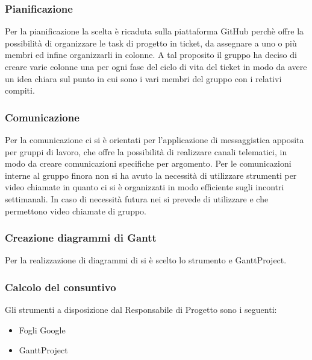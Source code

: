 \subsubsection{Pianificazione}
Per la pianificazione la scelta è ricaduta sulla piattaforma GitHub perchè offre la possibilità di organizzare le task di progetto in ticket, da assegnare a uno o più membri ed infine organizzarli in colonne. A tal proposito il gruppo ha deciso di creare varie colonne una per ogni fase del ciclo di vita del ticket in modo da avere un idea chiara sul punto in cui sono i vari membri del gruppo con i relativi compiti.
\subsubsection{Comunicazione}
Per la comunicazione ci si è orientati per l'applicazione di messaggistica  apposita per gruppi di lavoro, che offre la possibilità di realizzare canali telematici, in modo da creare comunicazioni specifiche per argomento.
Per le comunicazioni interne al gruppo finora non si ha avuto la necessità di utilizzare strumenti per video chiamate in quanto ci si è organizzati in modo efficiente sugli incontri settimanali. In caso di necessità futura nei si prevede di utilizzare  e  che permettono video chiamate di gruppo.
\subsubsection{Creazione diagrammi di Gantt}
Per la realizzazione di diagrammi di  si è scelto lo strumento  e   GanttProject.

\subsubsection{Calcolo del consuntivo}
Gli strumenti a disposizione dal Responsabile di Progetto sono i seguenti:
\begin{itemize}
    \item Fogli Google
    \item GanttProject
\end{itemize}
\item
